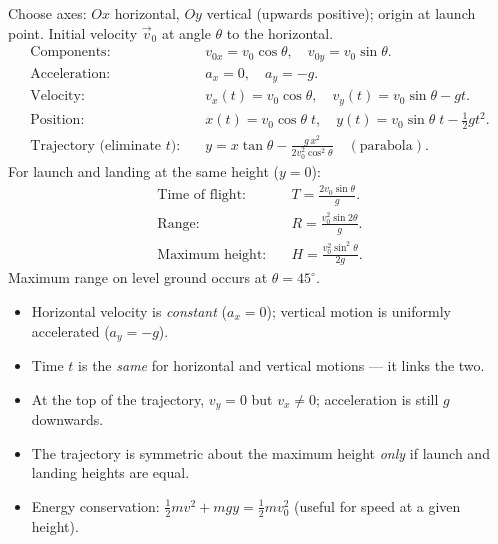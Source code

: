 \documentclass[11pt]{article}
\begin{document}
\begin{propriete}
Choose axes: $Ox$ horizontal, $Oy$ vertical (upwards positive); origin at launch point. Initial velocity $\vec{v}_0$ at angle $\theta$ to the horizontal.
\begin{align*}
\text{Components:} &\quad v_{0x} = v_0\cos\theta, \quad v_{0y} = v_0\sin\theta. \\
\text{Acceleration:} &\quad a_x = 0, \quad a_y = -g. \\
\text{Velocity:} &\quad v_x(t) = v_0\cos\theta, \quad v_y(t) = v_0\sin\theta - gt. \\
\text{Position:} &\quad x(t) = v_0\cos\theta\; t, \quad y(t) = v_0\sin\theta\; t - \tfrac{1}{2}gt^{2}. \\
\text{Trajectory (eliminate $t$):} &\quad y = x\tan\theta - \frac{g\,x^{2}}{2v_0^{2}\cos^{2}\theta} \quad (\text{parabola}).
\end{align*}
For launch and landing at the same height ($y=0$):
\begin{align*}
\text{Time of flight:} &\quad T = \frac{2v_0\sin\theta}{g}. \\
\text{Range:} &\quad R = \frac{v_0^{2}\sin 2\theta}{g}. \\
\text{Maximum height:} &\quad H = \frac{v_0^{2}\sin^{2}\theta}{2g}.
\end{align*}
Maximum range on level ground occurs at $\theta = 45^{\circ}$.
\end{propriete}

\begin{aretenir}
\begin{itemize}
\item Horizontal velocity is \emph{constant} ($a_x=0$); vertical motion is uniformly accelerated ($a_y=-g$).
\item Time $t$ is the \emph{same} for horizontal and vertical motions — it links the two.
\item At the top of the trajectory, $v_y = 0$ but $v_x \neq 0$; acceleration is still $g$ downwards.
\item The trajectory is symmetric about the maximum height \emph{only} if launch and landing heights are equal.
\item Energy conservation: $\frac{1}{2}mv^{2} + mgy = \frac{1}{2}mv_0^{2}$ (useful for speed at a given height).
\end{itemize}
\end{aretenir}
\end{document}
